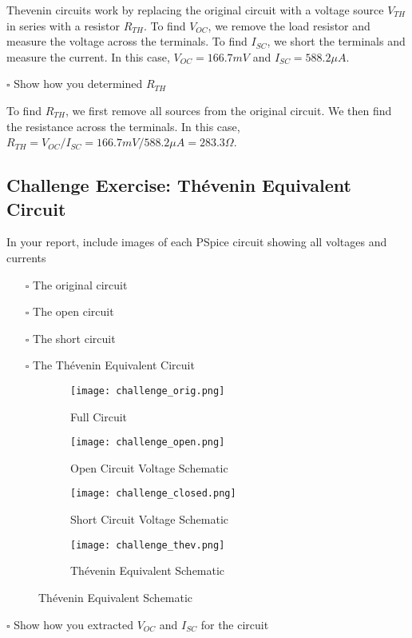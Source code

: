 \documentclass[12pt]{article}
\begin{document}
Thevenin circuits work by replacing the original circuit with a voltage source $V_{TH}$ in series with a resistor $R_{TH}$. To find $V_{OC}$, we remove the load resistor and measure the voltage across the terminals. To find $I_{SC}$, we short the terminals and measure the current. In this case, $V_{OC} = 166.7mV$ and $I_{SC} = 588.2 \mu A$.

$\square$ Show how you determined $R_{TH}$

To find $R_{TH}$, we first remove all sources from the original circuit. We then find the resistance across the terminals. In this case, $R_{TH} = V_{OC}/I_{SC} = 166.7mV/588.2 \mu A = 283.3 \Omega$.

\newpage
\subsection{Challenge Exercise: Th\'evenin Equivalent Circuit}
In your report, include images of each PSpice circuit showing all voltages and
currents
\begin{itemize}
\setlength\itemsep{-0.5em}
\item[$\square$] The original circuit
\item[$\square$] The open circuit
\item[$\square$] The short circuit
\item[$\square$] The Th\'evenin Equivalent Circuit
\end{itemize}
\begin{figure}[ht!]
\begin{subfigure}{0.5\textwidth}
\begin{center}
\texttt{[image: challenge\_orig.png]}
\caption{Full Circuit}
\end{center}
\end{subfigure}
\hfill
\begin{subfigure}{0.5\textwidth}
\begin{center}
\texttt{[image: challenge\_open.png]}
\caption{Open Circuit Voltage Schematic}
\end{center}
\end{subfigure}
\begin{subfigure}{0.5\textwidth}
\begin{center}
\texttt{[image: challenge\_closed.png]}
\vspace{0.7cm}
\caption{Short Circuit Voltage Schematic}
\end{center}
\end{subfigure}
\hfill
\begin{subfigure}{0.5\textwidth}
\begin{center}
\texttt{[image: challenge\_thev.png]}
\caption{Th\'evenin Equivalent Schematic}
\end{center}
\end{subfigure}
\end{figure}
$\square$ Show how you extracted $V_{OC}$ and $I_{SC}$ for the circuit
\end{document}
